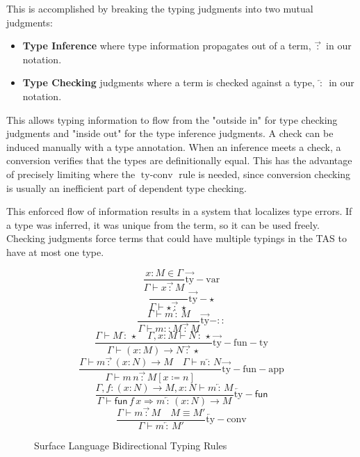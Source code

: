 
This is accomplished by breaking the typing judgments into two mutual judgments:
\begin{itemize}
\item \textbf{Type Inference} where type information propagates out of a term, $\overrightarrow{\,:\,}$ in our notation. 
\item \textbf{Type Checking} judgments where a term is checked against a type, $\overleftarrow{\,:\,}$ in our notation. 
\end{itemize}
This allows typing information to flow from the "outside in" for type checking judgments and "inside out" for the type inference judgments.
A check can be induced manually with a type annotation.
When an inference meets a check, a conversion verifies that the types are definitionally equal.
This has the advantage of precisely limiting where the $\operatorname{ty-conv}$ rule is needed, since conversion checking is usually an inefficient part of dependent type checking.

This enforced flow of information results in a system that localizes type errors.
If a type was inferred, it was unique from the term, so it can be used freely.
Checking judgments force terms that could have multiple typings in the \ac{TAS} to have at most one type.

\begin{figure}
\[
\frac{x:M\in\Gamma}{\Gamma\vdash x\overrightarrow{\,:\,}M}\operatorname{\overrightarrow{ty}-var}
\]
\[
\frac{\,}{\Gamma\vdash\star\overrightarrow{\,:\,}\star}\operatorname{\overrightarrow{ty}-\star}
\]
\[
\frac{\Gamma\vdash m\overleftarrow{\,:\,}M}{\Gamma\vdash m::M\overrightarrow{\,:\,}M}\operatorname{\overrightarrow{ty}-::}
\]
\[
\frac{\Gamma\vdash M\overleftarrow{\,:\,}\star\quad\Gamma,x:M\vdash N\overleftarrow{\,:\,}\star}{\Gamma\vdash\left(x:M\right)\rightarrow N\overrightarrow{\,:\,}\star}\operatorname{\overrightarrow{ty}-fun-ty}
\]
\[
\frac{\Gamma\vdash m\overrightarrow{\,:\,}\left(x:N\right)\rightarrow M\quad\Gamma\vdash n\overleftarrow{\,:\,}N}{\Gamma\vdash m\,n\overrightarrow{\,:\,}M\left[x\coloneqq n\right]}\operatorname{\overrightarrow{ty}-fun-app}
\]
\[
\frac{\Gamma,f:\left(x:N\right)\rightarrow M,x:N\vdash m\overleftarrow{\,:\,}M}{\Gamma\vdash\mathsf{fun}\,f\,x\Rightarrow m\overleftarrow{\,:\,}\left(x:N\right)\rightarrow M}\operatorname{\overleftarrow{ty}-\mathsf{fun}}
\]
\[
\frac{\Gamma\vdash m\overrightarrow{\,:\,}M\quad M\equiv M'}{\Gamma\vdash m\overleftarrow{\,:\,}M'}\operatorname{\overleftarrow{ty}-conv}
\]

\caption{Surface Language Bidirectional Typing Rules}
\label{fig:surface-bityping-rules}
\end{figure}
    
